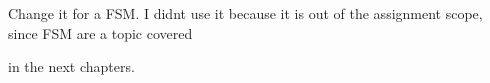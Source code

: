 
\begin{DoxyRefList}
\item[Member \mbox{\hyperlink{main_8cpp_a7608cc2745aacf4015d26cd4ff79d4aa}{debounce\+Button}} (\mbox{\hyperlink{structButton}{Button}} $\ast$button)]\label{todo__todo000001}%
%
Change it for a FSM. I didn\textquotesingle{}t use it because it is out of the assignment scope, since FSM are a topic covered 

in the next chapters. 
\end{DoxyRefList}